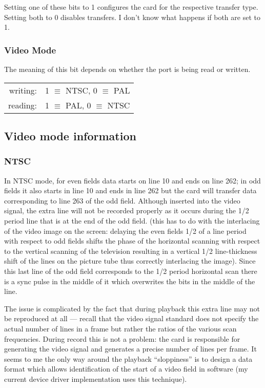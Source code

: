 \documentclass{article}
\begin{document}
Setting one of these bits to 1 configures the card for the respective
transfer type.  Setting both to 0 disables transfers.  I don't know what
happens if both are set to 1.


\subsubsection{Video Mode}

The meaning of this bit depends on whether the port is being read or
written.
\begin{center}
\begin{tabular}[t]{rl}
writing: & 1 \(\equiv\) NTSC, 0 \(\equiv\) PAL \\
reading: & 1 \(\equiv\) PAL, 0 \(\equiv\) NTSC
\end{tabular}
\end{center}


\subsection{Video mode information}

\subsubsection{NTSC}

In NTSC mode, for even fields data starts on line 10 and ends on line 262;
in odd fields it also starts in line 10 and ends in line 262 but the card
will transfer data corresponding to line 263 of the odd field.  Although
inserted into the video signal, the extra line will not be recorded
properly as it occurs during the 1/2 period line that is at the end of the
odd field. (this has to do with the interlacing of the video image on the
screen: delaying the even fields 1/2 of a line period with respect to odd
fields shifts the phase of the horizontal scanning with respect to the
vertical scanning of the television resulting in a vertical 1/2
line-thickness shift of the lines on the picture tube thus correctly
interlacing the image). Since this last line of the odd field corresponds
to the 1/2 period horizontal scan there is a sync pulse in the middle of
it which overwrites the bits in the middle of the line.

The issue is complicated by the fact that during playback this extra line
may not be reproduced at all --- recall that the video signal standard
does not specify the actual number of lines in a frame but rather the
ratios of the various scan frequencies.  During record this is not a
problem:  the card is responsible for generating the video signal and
generates a precise number of lines per frame.  It seems to me the only
way around the playback ``sloppiness'' is to design a data format which
allows identification of the start of a video field in software (my
current device driver implementation uses this technique).
\end{document}
